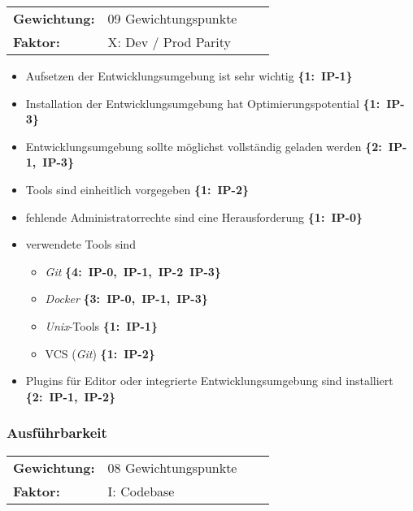 \vspace{0.5em}
\begin{tabular}{ll@{}ll@{}}
    \textbf{Gewichtung:}    &   09 Gewichtungspunkte    \\
    \textbf{Faktor:}        &   X: Dev / Prod Parity    \\
\end{tabular}

\begin{flushleft}
    \begin{itemize}
        \item Aufsetzen der Entwicklungsumgebung ist sehr wichtig \mbox{\textbf{\{1: IP-1\}}}
        \item Installation der Entwicklungsumgebung hat Optimierungspotential \mbox{\textbf{\{1: IP-3\}}}
        \item Entwicklungsumgebung sollte möglichst vollständig geladen werden \mbox{\textbf{\{2: IP-1, IP-3\}}}
        \item Tools sind einheitlich vorgegeben \mbox{\textbf{\{1: IP-2\}}}
        \item fehlende Administratorrechte sind eine Herausforderung \mbox{\textbf{\{1: IP-0\}}}
        \item verwendete Tools sind
        \begin{itemize}
            \item \textit{Git} \mbox{\textbf{\{4: IP-0, IP-1, IP-2 IP-3\}}}
            \item \textit{Docker} \mbox{\textbf{\{3: IP-0, IP-1, IP-3\}}}
            \item \textit{Unix}-Tools \mbox{\textbf{\{1: IP-1\}}}
            \item VCS (\textit{Git}) \mbox{\textbf{\{1: IP-2\}}}
        \end{itemize}
        \item Plugins für Editor oder integrierte Entwicklungsumgebung \linebreak[2] sind installiert \mbox{\textbf{\{2: IP-1, IP-2\}}}
    \end{itemize}
\end{flushleft}

\subsubsection{Ausführbarkeit}
\label{subsubsec:AA-04-01-02_req-dev-executability}

\vspace{0.5em}
\begin{tabular}{ll@{}ll@{}}
    \textbf{Gewichtung:}    &   08 Gewichtungspunkte    \\
    \textbf{Faktor:}        &   I: Codebase             \\
\end{tabular}

